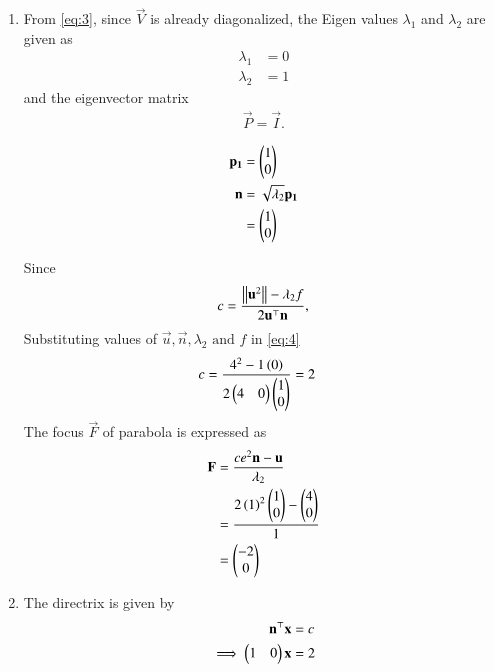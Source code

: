 \documentclass[journal,12pt,twocolumn]{IEEEtran}
\begin{document}
\begin{enumerate}
\begin{enumerate}
\item From \eqref{eq:3}, since $\vec{V}$ is already diagonalized, the Eigen values $\lambda_1$ and $\lambda_2$ are given as 
\begin{align}
\lambda_1 &= 0 \\
\lambda_2 &= 1 
\end{align}
and the eigenvector matrix
\begin{align}
\vec{P} = \vec{I}.
\end{align}

\begin{align}
\mathbf{p_1} &= \begin{pmatrix}1 \\ 0\end{pmatrix} \\
\mathbf{n} &= \sqrt{\lambda_2}\mathbf{p_1} \\
&= \begin{pmatrix}1 \\ 0\end{pmatrix} 
\end{align}

Since
\begin{align}
\label{eq:4}
c = \frac{\left\lVert\mathbf{u}^2\right\rVert-\lambda_2f}{2\mathbf{u}^\top\mathbf{n}},
\end{align}
Substituting values of $\vec{u}, \vec{n}, \lambda_2 \text{ and } f$ in \eqref{eq:4}
\begin{align}
c &= \frac{4^2-1\left(0\right)}{2 \begin{pmatrix}4 & 0\end{pmatrix}\begin{pmatrix}1 \\ 0\end{pmatrix}} = 2
\end{align}
The focus $\vec{F}$ of parabola is expressed as
\begin{align}
\mathbf{F} &= \frac{ce^2\mathbf{n}-\mathbf{u}}{\lambda_2} \\
&= \frac{2\left(1\right)^2\begin{pmatrix}1 \\0\end{pmatrix} - \begin{pmatrix}4 \\ 0\end{pmatrix}}{1} \\
&= \begin{pmatrix}-2 \\ 0\end{pmatrix}
\end{align}
\item The directrix is given by
\begin{align}
\mathbf{n}^\top\mathbf{x} &= c \\
\implies	\begin{pmatrix}1 & 0\end{pmatrix}\mathbf{x} &= 2
\end{align}


\end{enumerate}
\end{enumerate}
\end{document}
